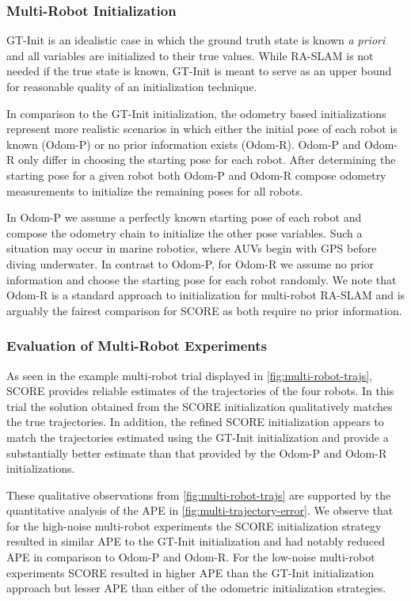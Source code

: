\subsubsection{Multi-Robot Initialization}
\label{sec:multi-robot-init}

GT-Init is an idealistic case in which the ground truth state is known \textit{a
priori} and all variables are initialized to their true values. While RA-SLAM is
not needed if the true state is known, GT-Init is meant to serve as an upper
bound for reasonable quality of an initialization technique.

In comparison to the GT-Init initialization, the odometry based initializations
represent more realistic scenarios in which either the initial pose of each
robot is known (Odom-P) or no prior information exists (Odom-R). Odom-P and
Odom-R only differ in choosing the starting pose for each robot. After
determining the starting pose for a given robot both Odom-P and Odom-R compose
odometry measurements to initialize the remaining poses for all robots.

In Odom-P we assume a perfectly known starting pose of each robot and compose
the odometry chain to initialize the other pose variables. Such a situation may
occur in marine robotics, where AUVs begin with GPS before diving underwater.
In contrast to Odom-P, for Odom-R we assume no prior information and choose the
starting pose for each robot randomly. We note that Odom-R is a standard
approach to initialization for multi-robot RA-SLAM \cite{guo2017ijmav,li20arxiv}
and is arguably the fairest comparison for SCORE as both require no prior
information.


\subsubsection{Evaluation of Multi-Robot Experiments}

As seen in the example multi-robot trial displayed in
\cref{fig:multi-robot-trajs}, SCORE provides reliable estimates of the
trajectories of the four robots. In this trial the solution obtained from the
SCORE initialization qualitatively matches the true trajectories. In addition,
the refined SCORE initialization appears to match the trajectories estimated
using the GT-Init initialization and provide a substantially better estimate
than that provided by the Odom-P and Odom-R initializations.

These qualitative observations from \cref{fig:multi-robot-trajs} are supported
by the quantitative analysis of the APE in \cref{fig:multi-trajectory-error}. We
observe that for the high-noise multi-robot experiments the SCORE initialization
strategy resulted in similar APE to the GT-Init initialization and had notably
reduced APE in comparison to Odom-P and Odom-R. For the low-noise multi-robot
experiments SCORE resulted in higher APE than the GT-Init initialization
approach but lesser APE than either of the odometric initialization strategies.
